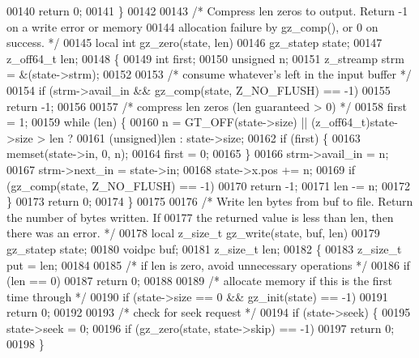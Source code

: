 \begin{DoxyCode}
00140     \textcolor{keywordflow}{return} 0;
00141 \}
00142 
00143 \textcolor{comment}{/* Compress len zeros to output.  Return -1 on a write error or memory}
00144 \textcolor{comment}{   allocation failure by gz\_comp(), or 0 on success. */}
00145 local \textcolor{keywordtype}{int} gz\_zero(state, len)
00146     gz\_statep state;
00147     z\_off64\_t len;
00148 \{
00149     \textcolor{keywordtype}{int} first;
00150     \textcolor{keywordtype}{unsigned} n;
00151     z\_streamp strm = &(state->strm);
00152 
00153     \textcolor{comment}{/* consume whatever's left in the input buffer */}
00154     \textcolor{keywordflow}{if} (strm->avail\_in && gz\_comp(state, Z\_NO\_FLUSH) == -1)
00155         \textcolor{keywordflow}{return} -1;
00156 
00157     \textcolor{comment}{/* compress len zeros (len guaranteed > 0) */}
00158     first = 1;
00159     \textcolor{keywordflow}{while} (len) \{
00160         n = GT\_OFF(state->size) || (z\_off64\_t)state->size > len ?
00161             (\textcolor{keywordtype}{unsigned})len : state->size;
00162         \textcolor{keywordflow}{if} (first) \{
00163             memset(state->in, 0, n);
00164             first = 0;
00165         \}
00166         strm->avail\_in = n;
00167         strm->next\_in = state->in;
00168         state->x.pos += n;
00169         \textcolor{keywordflow}{if} (gz\_comp(state, Z\_NO\_FLUSH) == -1)
00170             \textcolor{keywordflow}{return} -1;
00171         len -= n;
00172     \}
00173     \textcolor{keywordflow}{return} 0;
00174 \}
00175 
00176 \textcolor{comment}{/* Write len bytes from buf to file.  Return the number of bytes written.  If}
00177 \textcolor{comment}{   the returned value is less than len, then there was an error. */}
00178 local z\_size\_t gz\_write(state, buf, len)
00179     gz\_statep state;
00180     voidpc buf;
00181     z\_size\_t len;
00182 \{
00183     z\_size\_t put = len;
00184 
00185     \textcolor{comment}{/* if len is zero, avoid unnecessary operations */}
00186     \textcolor{keywordflow}{if} (len == 0)
00187         \textcolor{keywordflow}{return} 0;
00188 
00189     \textcolor{comment}{/* allocate memory if this is the first time through */}
00190     \textcolor{keywordflow}{if} (state->size == 0 && gz\_init(state) == -1)
00191         \textcolor{keywordflow}{return} 0;
00192 
00193     \textcolor{comment}{/* check for seek request */}
00194     \textcolor{keywordflow}{if} (state->seek) \{
00195         state->seek = 0;
00196         \textcolor{keywordflow}{if} (gz\_zero(state, state->skip) == -1)
00197             \textcolor{keywordflow}{return} 0;
00198     \}

\end{DoxyCode}
